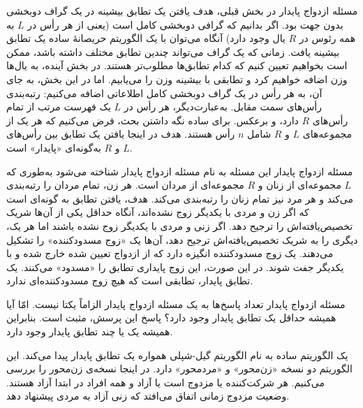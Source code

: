 \begin{itemframe}{مسئله ازدواج پایدار}
\itm
در بخش قبلی، هدف یافتن یک تطابق بیشینه در یک گراف دوبخشی بدون جهت بود.
اگر بدانیم که گرافی دوبخشی کامل است (یعنی از هر رأس در $L$ به همه رئوس در $R$ یال وجود دارد) آنگاه می‌توان با یک الگوریتم حریصانهٔ ساده یک تطابق بیشینه یافت.
\itm
زمانی که یک گراف می‌تواند چندین تطابق مختلف داشته باشد، ممکن است بخواهیم تعیین کنیم که کدام تطابق‌ها مطلوب‌تر هستند. در بخش آینده، به یال‌ها وزن اضافه خواهیم کرد و تطابقی با بیشینه وزن را می‌یابیم.
\itm
اما در این بخش، به جای آن، به هر رأس در یک گراف دوبخشی کامل اطلاعاتی اضافه می‌کنیم: رتبه‌بندی رأس‌های سمت مقابل. به‌عبارت‌دیگر، هر رأس در $L$ یک فهرست مرتب از تمام رأس‌های $R$ دارد، و برعکس. برای ساده نگه داشتن بحث، فرض می‌کنیم که هر یک از مجموعه‌های $L$ و $R$ شامل $n$ رأس هستند. هدف در اینجا یافتن یک تطابق بین رأس‌های $L$ و $R$ به‌گونه‌ای «پایدار» است.
\end{itemframe}

\begin{itemframe}{مسئله ازدواج پایدار}
\itm
این مسئله به نام مسئله ازدواج پایدار
شناخته می‌شود به‌طوری که $L$ مجموعه‌ای از زنان و $R$ مجموعه‌ای از مردان است. هر زن، تمام مردان را  رتبه‌بندی می‌کند و هر مرد نیز تمام زنان را رتبه‌بندی می‌کند.
\itm
هدف، یافتن تطابق به گونه‌ای است که اگر زن و مردی با یکدیگر زوج نشده‌اند، آنگاه حداقل یکی از آن‌ها شریک تخصیص‌یافته‌اش را ترجیح دهد.
\itm
اگر زنی و مردی با یکدیگر زوج نشده باشند اما هر یک، دیگری را به شریک تخصیص‌یافته‌اش ترجیح دهد، آن‌ها یک «زوج مسدودکننده»
را تشکیل می‌دهند. یک زوج مسدودکننده انگیزه دارد که از ازدواج تعیین شده خارج شده و با یکدیگر جفت شوند. در این صورت، این زوج پایداری تطابق را «مسدود» می‌کنند.
\itm
یک تطابق پایدار، تطابقی است که هیچ زوج مسدودکننده‌ای ندارد.
\end{itemframe}

\begin{itemframe}{مسئله ازدواج پایدار}
\itm
تعداد پاسخ‌ها به یک مسئله ازدواج پایدار الزاماً یکتا نیست. امّا آیا همیشه حداقل یک تطابق پایدار وجود دارد؟ پاسخ این پرسش، مثبت است. بنابراین همیشه یک یا چند تطابق پایدار وجود دارد.

\itm
یک الگوریتم ساده به نام الگوریتم گیل-شپلی
همواره یک تطابق پایدار پیدا می‌کند. این الگوریتم دو نسخه «زن‌محور»
و «مرد‌محور»
دارد. در اینجا نسخه‌ی زن‌محور را بررسی می‌کنیم.
\itm
هر شرکت‌کننده یا مزدوج است یا آزاد و همه افراد در ابتدا آزاد هستند.
وضعیت مزدوج زمانی اتفاق می‌افتد که زنی آزاد به مردی پیشنهاد دهد.
\end{itemframe}

